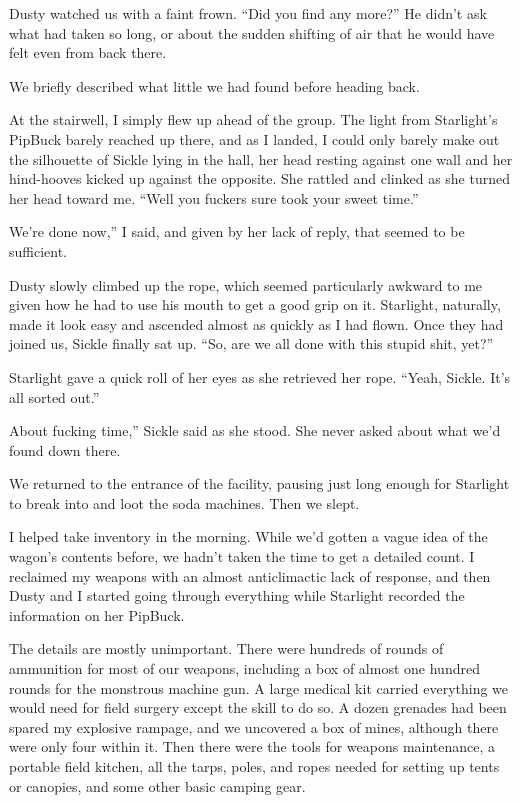 Dusty watched us with a faint frown. “Did you find any more?” He didn’t ask what had taken so long, or about the sudden shifting of air that he would have felt even from back there.

We briefly described what little we had found before heading back.

At the stairwell, I simply flew up ahead of the group. The light from Starlight’s PipBuck barely reached up there, and as I landed, I could only barely make out the silhouette of Sickle lying in the hall, her head resting against one wall and her hind-hooves kicked up against the opposite. She rattled and clinked as she turned her head toward me. “Well you fuckers sure took your sweet time.”

\leavevmode{}We’re done now,” I said, and given by her lack of reply, that seemed to be sufficient.

Dusty slowly climbed up the rope, which seemed particularly awkward to me given how he had to use his mouth to get a good grip on it. Starlight, naturally, made it look easy and ascended almost as quickly as I had flown. Once they had joined us, Sickle finally sat up. “So, are we all done with this stupid shit, yet?”

Starlight gave a quick roll of her eyes as she retrieved her rope. “Yeah, Sickle. It’s all sorted out.”

\leavevmode{}About fucking time,” Sickle said as she stood. She never asked about what we’d found down there.

We returned to the entrance of the facility, pausing just long enough for Starlight to break into and loot the soda machines. Then we slept.

{\br}%
I helped take inventory in the morning. While we’d gotten a vague idea of the wagon’s contents before, we hadn’t taken the time to get a detailed count. I reclaimed my weapons with an almost anticlimactic lack of response, and then Dusty and I started going through everything while Starlight recorded the information on her PipBuck.

The details are mostly unimportant. There were hundreds of rounds of ammunition for most of our weapons, including a box of almost one hundred rounds for the monstrous machine gun. A large medical kit carried everything we would need for field surgery except the skill to do so. A dozen grenades had been spared my explosive rampage, and we uncovered a box of mines, although there were only four within it. Then there were the tools for weapons maintenance, a portable field kitchen, all the tarps, poles, and ropes needed for setting up tents or canopies, and some other basic camping gear.

